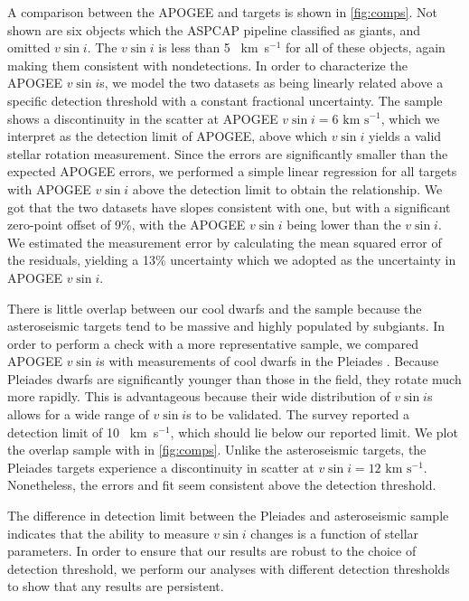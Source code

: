 \documentclass[manuscript]{aastex6}
\newcommand{\vsini}{\ensuremath{v \sin i}}
\newcommand{\kms}{\textrm{~km~s}\ensuremath{^{-1}}}
\begin{document}
A comparison between the APOGEE and \citet{Bruntt12} targets is shown in
\cref{fig:comps}. Not shown are six
objects which the ASPCAP pipeline classified as giants, and omitted
\vsini{}. The \citet{Bruntt12} \vsini{} is less than 5
\kms{} for all of these objects, again making them consistent with 
nondetections.  In order to characterize the APOGEE \vsini{}s, we model the 
two datasets as being linearly related above a specific detection threshold 
with a constant fractional uncertainty. The sample shows a 
discontinuity in the scatter at APOGEE \(\vsini=6\kms\), which we 
interpret as the detection limit of APOGEE, above which \vsini{} yields a 
valid stellar rotation measurement. Since the \citet{Bruntt12} errors are
significantly smaller than the expected APOGEE errors, we performed a simple 
linear regression for all targets with APOGEE \vsini{} above the detection 
limit to obtain the relationship. We got that the two datasets have slopes
consistent with one, but with a significant zero-point offset of 9\%,
with the APOGEE \vsini{} being lower than the \citet{Bruntt12}
\vsini{}. We estimated the measurement error by calculating the mean squared 
error of the residuals, yielding a 13\% uncertainty which we adopted as the 
uncertainty in APOGEE \vsini{}.

There is little overlap between our cool dwarfs and the 
\citet{Bruntt12} sample because the asteroseismic targets tend to be massive and 
highly populated by subgiants. In order to perform a check with a more
representative sample, we compared APOGEE \vsini{}s with  
measurements of cool dwarfs in the Pleiades \citep{Stauffer87}. Because
Pleiades dwarfs are significantly younger than those in the field,
they rotate much more rapidly. This is advantageous because their 
wide distribution of \vsini{}s allows for a wide range of \vsini{}s to be 
validated. The \citet{Stauffer87} survey reported a detection limit of
10 \kms, which should lie below our reported limit. We plot the overlap 
sample with \citet{Stauffer87} in \cref{fig:comps}.  Unlike the asteroseismic 
targets, the Pleiades targets experience a discontinuity in scatter at 
\(\vsini = 12 \kms\).  Nonetheless, the errors and fit seem consistent above 
the detection threshold.

The difference in detection limit between the Pleiades and asteroseismic sample
indicates that the ability to measure \vsini{} changes is a function of stellar
parameters. In order to ensure that our results are robust to the choice of
detection threshold, we
perform our analyses with different detection thresholds to show that any
results are persistent.
\end{document}
